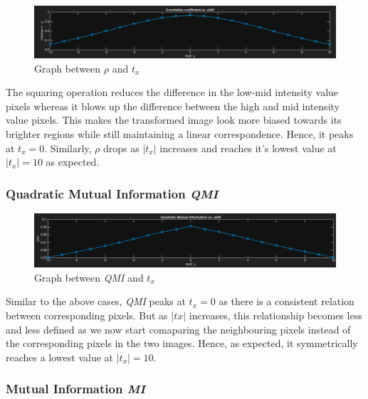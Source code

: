 \documentclass{report}
\begin{document}
\begin{figure}[h]
    \centering
    \includegraphics[width=\textwidth]{q4_2_corr.png}
    \caption{Graph between $\rho$ and $t_x$}
\end{figure}

The squaring operation reduces the difference in the low-mid intensity value pixels whereas it blows up the difference between the high and mid intensity value pixels. This makes the transformed image look more biased towards its brighter regions while still maintaining a linear correspondence. Hence, it peaks at $t_x = 0$. Similarly, $\rho$ drops as $|t_x|$ increases and reaches it's lowest value at $|t_x| = 10$ as expected.

\vspace{1em}

\subsubsection*{Quadratic Mutual Information \textit{QMI}}

\begin{figure}[h]
    \centering
    \includegraphics[width=\textwidth]{q4_2_qmi.png}
    \caption{Graph between \textit{QMI} and $t_x$}
\end{figure}

Similar to the above cases, \textit{QMI} peaks at $t_x = 0$ as there is a consistent relation between corresponding pixels. But as $|tx|$ increases, this relationship becomes less and less defined as we now start comaparing the neighbouring pixels instead of the corresponding pixels in the two images. Hence, as expected, it symmetrically reaches a lowest value at $|t_x| = 10$.

\newpage

\subsubsection*{Mutual Information \textit{MI}}
\end{document}
